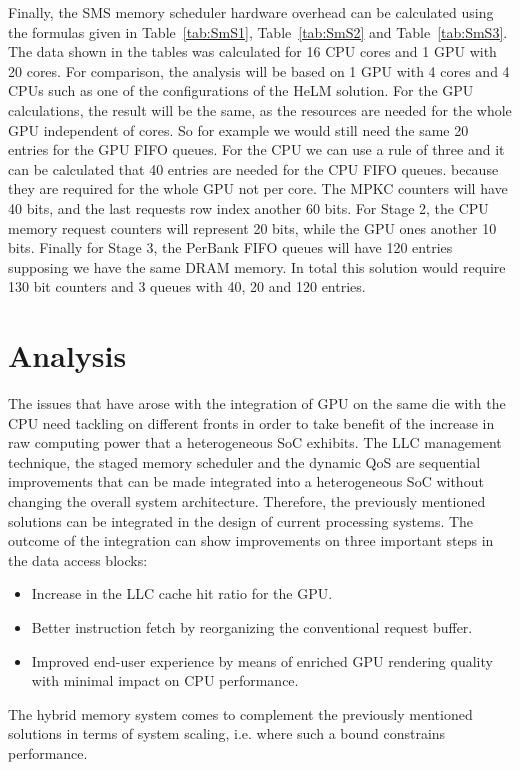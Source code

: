 \documentclass[journal]{IEEEtran}
\begin{document}
Finally, the SMS memory scheduler hardware overhead can be calculated using the formulas given in Table~\ref{tab:SmS1}, Table~\ref{tab:SmS2} and Table~\ref{tab:SmS3}. The data shown in the tables was calculated for 16 CPU cores and 1 GPU with 20 cores. For comparison, the analysis will be based on 1 GPU with 4 cores and 4 CPUs such as one of the configurations of the HeLM solution. For the GPU calculations, the result will be the same, as the resources are needed for the whole GPU independent of cores. So for example we would still need the same 20 entries for the GPU FIFO queues. For the CPU we can use a rule of three and it can be calculated that 40 entries are needed for the CPU FIFO queues. because they are required for the whole GPU not per core. The MPKC counters will have 40 bits, and the last requests row index another 60 bits. For Stage 2, the CPU memory request counters will represent 20 bits, while the GPU ones another 10 bits. Finally for Stage 3, the PerBank FIFO queues will have 120 entries supposing we have the same DRAM memory. In total this solution would require 130 bit counters and 3 queues with 40, 20 and 120 entries.

\section{Analysis}
The issues that have arose with the integration of GPU on the same die with the CPU need tackling on different fronts in order to take benefit of the increase in raw computing power that a heterogeneous SoC exhibits. 
The LLC management technique, the staged memory scheduler and the dynamic QoS are sequential improvements that can be made integrated into a heterogeneous SoC without changing the overall system architecture. Therefore, the previously mentioned solutions can be integrated in the design of current processing systems. The outcome of the integration can show improvements on three important steps in the data access blocks:
\begin{itemize}
	\item
	Increase in the LLC cache hit ratio for the GPU.
	\item
	Better instruction fetch by reorganizing the conventional request buffer.
	\item
	Improved end-user experience by means of enriched GPU rendering quality with minimal impact on CPU performance.
\end{itemize}

The hybrid memory system comes to complement the previously mentioned solutions in terms of system scaling, i.e. where such a bound constrains performance.
\end{document}
